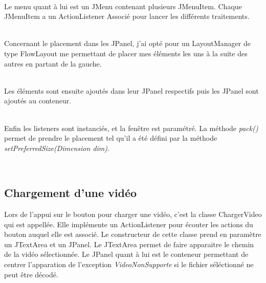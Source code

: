 \documentclass[10pt,a4paper]{article}
\begin{document}

~~\\

Le menu quant à lui est un JMenu contenant plusieurs JMenuItem. Chaque JMenuItem a un ActionListener Associé pour lancer les différents traitements.


~~\\


Concernant le placement dans les JPanel, j'ai opté pour un LayoutManager de type FlowLayout me permettant de placer mes éléments les uns à la suite des autres en partant de la gauche.


~~\\

Les éléments sont ensuite ajoutés dans leur JPanel respectifs puis les JPanel sont ajoutés au conteneur.


~~\\

Enfin les listeners sont instanciés, et la fenêtre est paramétré. La méthode \textit{pack()} permet de prendre le placement tel qu'il a été défini par la méthode \textit{setPreferredSize(Dimension dim)}.


~~\\
\subsection{Chargement d'une vidéo}

Lors de l'appui sur le bouton pour charger une vidéo, c'est la classe ChargerVideo qui est appellée. Elle implémente un ActionListener pour écouter les actions du bouton auquel elle est associé.
Le constructeur de cette classe prend en paramètre un JTextArea et un JPanel. Le JTextArea permet de faire apparaitre le chemin de la vidéo sélectionnée. Le JPanel quant à lui est le conteneur permettant
de centrer l'apparation de l'exception \textit{VideoNonSupporte} si le fichier séléctionné ne peut être décodé.
\end{document}
